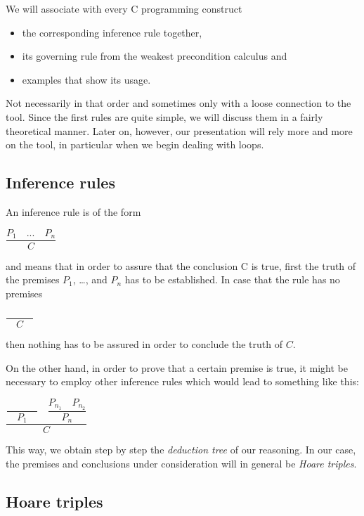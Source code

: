 \documentclass[12pt,francais,]{scrbook}
\providecommand{\tightlist}{%
  \setlength{\itemsep}{0pt}\setlength{\parskip}{0pt}}
\begin{document}
We will associate with every C programming construct

\begin{itemize}
\tightlist
\item
  the corresponding inference rule together,
\item
  its governing rule from the weakest precondition calculus and
\item
  examples that show its usage.
\end{itemize}

Not necessarily in that order and sometimes only with a loose connection
to the tool. Since the first rules are quite simple, we will discuss
them in a fairly theoretical manner. Later on, however, our presentation
will rely more and more on the tool, in particular when we begin dealing
with loops.

\subsection{Inference rules}\label{inference-rules}

An inference rule is of the form

\begin{center} \(\dfrac{P_1 \quad ... \quad P_n}{C}\) \end{center}

and means that in order to assure that the conclusion C is true, first
the truth of the premises \(P_1\), \ldots{}, and \(P_n\) has to be
established. In case that the rule has no premises

\begin{center} \(\dfrac{}{\quad C \quad}\) \end{center}

then nothing has to be assured in order to conclude the truth of \(C\).

On the other hand, in order to prove that a certain premise is true, it
might be necessary to employ other inference rules which would lead to
something like this:

\begin{center}
\(\dfrac{\dfrac{}{\quad P_1\quad} \quad \dfrac{P_{n_1}\quad P_{n_2}}{P_n}}{C}\)
\end{center}

This way, we obtain step by step the \emph{deduction tree} of our
reasoning. In our case, the premises and conclusions under consideration
will in general be \emph{Hoare triples}.

\subsection{Hoare triples}\label{hoare-triples-1}
\end{document}
